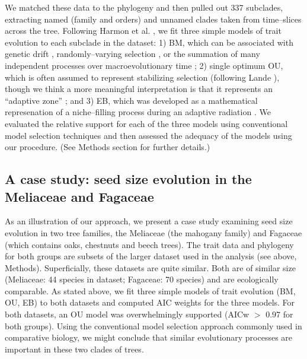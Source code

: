 \documentclass[a4paper,12pt]{article}
\begin{document}
We  matched these data to the phylogeny and then
pulled out 337 subclades, extracting named (family and orders) and unnamed clades taken from time--slices across the tree. Following Harmon et al. \citep{Harmon2010}, we fit three simple models of trait evolution to each subclade in the dataset: 1) BM, which can be associated with genetic drift \citep{Lande1976, Felsenstein1988, Lynch1990, HansenMartins1996}, randomly--varying selection \citep{Felsenstein1973}, or the summation of many independent processes over macroevolutionary time \citep{HansenMartins1996, Uyeda2011, PennellPE}; 2) single optimum OU, which is often assumed to represent stabilizing selection (following Lande \citep{Lande1976}), though we think a more meaningful interpretation is that it represents an ``adaptive zone'' \citep{Hansen2012book, PennellHarmon}; and 3) EB, which was developed as a mathematical represenation of a niche--filling process during an adaptive radiation \citep{Harmon2010, SlaterPennell}. We evaluated the relative support for each of the three models using conventional model selection techniques and then assessed the adequacy of the models using our procedure. (See Methods section for further details.) 


\subsection{A case study: seed size evolution in the Meliaceae and Fagaceae }
As an illustration of our approach, we present a case study examining seed size evolution in two tree families, the Meliaceae (the mahogany family) and Fagaceae (which contains oaks, chestnuts and beech trees). The trait data and phylogeny for both groups are subsets of the larger dataset used in the analysis (see above, Methods). Superficially, these datasets are quite similar. Both are of similar size (Meliaceae: 44 species in dataset; Fagaceae: 70 species) and are ecologically comparable. As stated above, we fit three simple models of trait evolution (BM, OU, EB) to both datasets and computed AIC weights \citep{aicweight} for the three models. For both datasets, an OU model was overwhelmingly supported (AICw $>$ 0.97 for both groups). Using the conventional model selection approach commonly used in comparative biology, we might conclude that similar evolutionary processes are important in these two clades of trees.
\end{document}
